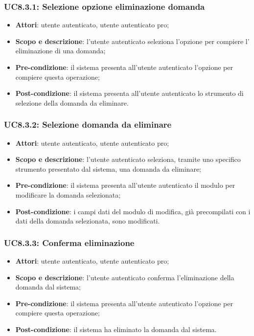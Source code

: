 	\subsubsection{UC8.3.1: Selezione opzione eliminazione domanda}
	\begin{itemize}
		\item
			\textbf{Attori}: utente autenticato, utente autenticato pro;
		\item
			\textbf{Scopo e descrizione}: l'utente autenticato seleziona l'opzione per compiere l' eliminazione di una domanda;
		\item		
			\textbf{Pre-condizione}: il sistema presenta all'utente autenticato l'opzione per compiere questa operazione;
		\item
			\textbf{Post-condizione}: il sistema presenta all'utente autenticato lo strumento di selezione della domanda da eliminare.
	\end{itemize}
	\subsubsection{UC8.3.2: Selezione domanda da eliminare}
	\begin{itemize}
		\item
			\textbf{Attori}: utente autenticato, utente autenticato pro;
		\item
			\textbf{Scopo e descrizione}: l'utente autenticato seleziona, tramite uno specifico strumento presentato dal sistema, una domanda da eliminare;
		\item		
			\textbf{Pre-condizione}: il sistema presenta all'utente autenticato il modulo per modificare la domanda selezionata;
		\item
			\textbf{Post-condizione}: i campi dati del modulo di modifica, già precompilati con i dati della domanda selezionata, sono modificati.
	\end{itemize}		
	\subsubsection{UC8.3.3: Conferma eliminazione}
	\begin{itemize}
		\item
			\textbf{Attori}: utente autenticato, utente autenticato pro;
		\item
			\textbf{Scopo e descrizione}: l'utente autenticato conferma l'eliminazione della domanda dal sistema;
		\item		
			\textbf{Pre-condizione}: il sistema presenta all'utente autenticato l'opzione per compiere questa operazione;
		\item
			\textbf{Post-condizione}: il sistema ha eliminato la domanda dal sistema.
	\end{itemize}	